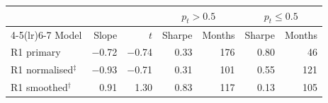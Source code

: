 \begin{tabular}{lrrrrrr}
\toprule
& & & \multicolumn{2}{c}{$p_t > 0.5$} & \multicolumn{2}{c}{$p_t \le 0.5$} \\
\cmidrule(lr){4-5}\cmidrule(lr){6-7}
Model & Slope & $t$ & Sharpe & Months & Sharpe & Months \\
\midrule
R1 primary & $-$0.72 & $-$0.74 & 0.33 & 176 & 0.80 & 46 \\
R1 normalised$^\ddagger$ & $-$0.93 & $-$0.71 & 0.31 & 101 & 0.55 & 121 \\
R1 smoothed$^\dagger$ & 0.91 & 1.30 & 0.83 & 117 & 0.13 & 105 \\
\bottomrule
\end{tabular}
